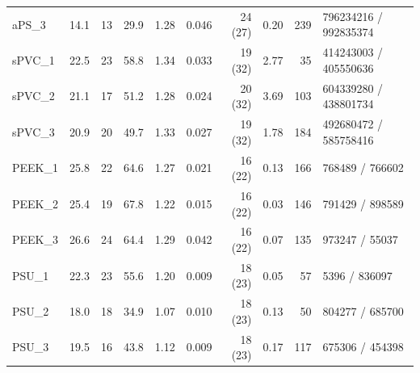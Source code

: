 \begin{longtable}{l r r r r r r r r l}
aPS\_3 & 14.1 & 13 & 29.9 & 1.28 & 0.046 & 24 (27) & 0.20 & 239 & 796234216 / 992835374 \\
sPVC\_1 & 22.5 & 23 & 58.8 & 1.34 & 0.033 & 19 (32) & 2.77 & 35 & 414243003 / 405550636 \\
sPVC\_2 & 21.1 & 17 & 51.2 & 1.28 & 0.024 & 20 (32) & 3.69 & 103 & 604339280 / 438801734 \\
sPVC\_3 & 20.9 & 20 & 49.7 & 1.33 & 0.027 & 19 (32) & 1.78 & 184 & 492680472 / 585758416 \\
PEEK\_1 & 25.8 & 22 & 64.6 & 1.27 & 0.021 & 16 (22) & 0.13 & 166 & 768489 / 766602 \\
PEEK\_2 & 25.4 & 19 & 67.8 & 1.22 & 0.015 & 16 (22) & 0.03 & 146 & 791429 / 898589 \\
PEEK\_3 & 26.6 & 24 & 64.4 & 1.29 & 0.042 & 16 (22) & 0.07 & 135 & 973247 / 55037 \\
PSU\_1 & 22.3 & 23 & 55.6 & 1.20 & 0.009 & 18 (23) & 0.05 & 57 & 5396 / 836097 \\
PSU\_2 & 18.0 & 18 & 34.9 & 1.07 & 0.010 & 18 (23) & 0.13 & 50 & 804277 / 685700 \\
PSU\_3 & 19.5 & 16 & 43.8 & 1.12 & 0.009 & 18 (23) & 0.17 & 117 & 675306 / 454398 \\
\end{longtable}
\normalsize
